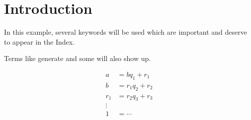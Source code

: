\documentclass{article}
\begin{document}
\section{Introduction}
In this example, several keywords will be used 
which are important and deserve to appear in the Index.

Terms like generate and some will 
also show up. 

\begin{align*}
    a &= bq_{1} + r_{1} \tag{n} \\
    b &= r_{1}q_{2} + r_{2} \tag{2} \\
    r_{1} &= r_{2}q_{3} + r_{3} \tag{3} \\
    \vdots & \\
    1 &= \cdots \tag{n}
\end{align*}


\printindex
\end{document}
